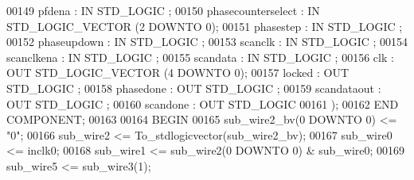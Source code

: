 \begin{DoxyCode}
{00149             pfdena  : \textcolor{keywordflow}{IN} \textcolor{comment}{STD\_LOGIC} ;
00150             phasecounterselect  : \textcolor{keywordflow}{IN} \textcolor{comment}{STD\_LOGIC\_VECTOR} (\textcolor{vhdllogic}{}\textcolor{vhdllogic}{2} \textcolor{keywordflow}{DOWNTO} \textcolor{vhdllogic}{}\textcolor{vhdllogic}{0});
00151             phasestep   : \textcolor{keywordflow}{IN} \textcolor{comment}{STD\_LOGIC} ;
00152             phaseupdown : \textcolor{keywordflow}{IN} \textcolor{comment}{STD\_LOGIC} ;
00153             scanclk : \textcolor{keywordflow}{IN} \textcolor{comment}{STD\_LOGIC} ;
00154             scanclkena  : \textcolor{keywordflow}{IN} \textcolor{comment}{STD\_LOGIC} ;
00155             scandata    : \textcolor{keywordflow}{IN} \textcolor{comment}{STD\_LOGIC} ;
00156             clk : \textcolor{keywordflow}{OUT} \textcolor{comment}{STD\_LOGIC\_VECTOR} (\textcolor{vhdllogic}{}\textcolor{vhdllogic}{4} \textcolor{keywordflow}{DOWNTO} \textcolor{vhdllogic}{}\textcolor{vhdllogic}{0});
00157             locked  : \textcolor{keywordflow}{OUT} \textcolor{comment}{STD\_LOGIC} ;
00158             phasedone   : \textcolor{keywordflow}{OUT} \textcolor{comment}{STD\_LOGIC} ;
00159             scandataout : \textcolor{keywordflow}{OUT} \textcolor{comment}{STD\_LOGIC} ;
00160             scandone    : \textcolor{keywordflow}{OUT} \textcolor{comment}{STD\_LOGIC} 
00161     );
00162     \textcolor{keywordflow}{END} \textcolor{keywordflow}{COMPONENT};
00163 
00164 \textcolor{vhdlkeyword}{BEGIN}
00165     \textcolor{vhdlchar}{sub_wire2_bv}\textcolor{vhdlchar}{(}\textcolor{vhdllogic}{}\textcolor{vhdllogic}{0} \textcolor{keywordflow}{DOWNTO} \textcolor{vhdllogic}{}\textcolor{vhdllogic}{0}\textcolor{vhdlchar}{)} \textcolor{vhdlchar}{<=} \textcolor{vhdllogic}{"0"};
00166     \textcolor{vhdlchar}{sub_wire2}    \textcolor{vhdlchar}{<=} \textcolor{vhdlchar}{To\_stdlogicvector}\textcolor{vhdlchar}{(}\textcolor{vhdlchar}{sub_wire2_bv}\textcolor{vhdlchar}{)};
00167     \textcolor{vhdlchar}{sub_wire0}    \textcolor{vhdlchar}{<=} \textcolor{vhdlchar}{inclk0};
00168     \textcolor{vhdlchar}{sub_wire1}    \textcolor{vhdlchar}{<=} \textcolor{vhdlchar}{sub_wire2}\textcolor{vhdlchar}{(}\textcolor{vhdllogic}{}\textcolor{vhdllogic}{0} \textcolor{keywordflow}{DOWNTO} \textcolor{vhdllogic}{}\textcolor{vhdllogic}{0}\textcolor{vhdlchar}{)} \textcolor{vhdlchar}{&} \textcolor{vhdlchar}{sub_wire0};
00169     \textcolor{vhdlchar}{sub_wire5}    \textcolor{vhdlchar}{<=} \textcolor{vhdlchar}{sub_wire3}\textcolor{vhdlchar}{(}\textcolor{vhdllogic}{}\textcolor{vhdllogic}{1}\textcolor{vhdlchar}{)};
}
\end{DoxyCode}

